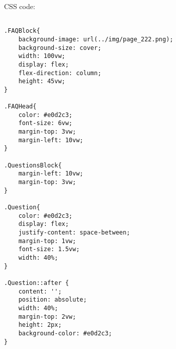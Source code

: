 CSS code:
\begin{verbatim}
    
.FAQBlock{
    background-image: url(../img/page_222.png);
    background-size: cover;
    width: 100vw;
    display: flex;
    flex-direction: column;
    height: 45vw;
}

.FAQHead{
    color: #e0d2c3;
    font-size: 6vw;
    margin-top: 3vw;
    margin-left: 10vw; 
}

.QuestionsBlock{
    margin-left: 10vw;
    margin-top: 3vw;
}

.Question{
    color: #e0d2c3;
    display: flex;
    justify-content: space-between;
    margin-top: 1vw;
    font-size: 1.5vw;
    width: 40%;
}

.Question::after {
    content: '';
    position: absolute;
    width: 40%;
    margin-top: 2vw;
    height: 2px;
    background-color: #e0d2c3;
}
\end{verbatim}